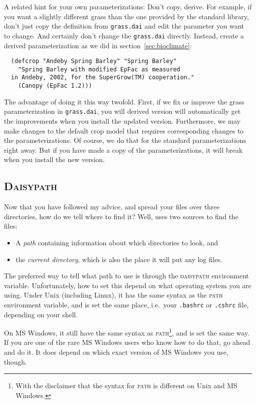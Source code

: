 \documentclass[a4paper,11pt]{article}
\begin{document}
A related hint for your own parameterizations: Don't copy, derive.
For example, if you want a slightly different grass than the one
provided by the standard \daisy{} library, don't just copy the
definition from \texttt{grass.dai} and edit the parameter you want to
change.  And certainly don't change the \texttt{grass.dai} directly.
Instead, create a derived parameterization as we did in
section~\ref{sec:bioclimate}:
\begin{verbatim}
  (defcrop "Andeby Spring Barley" "Spring Barley"
    "Spring Barley with modified EpFac as measured
  in Andeby, 2002, for the SuperGrow(TM) cooperation."
    (Canopy (EpFac 1.2)))
\end{verbatim}
The advantage of doing it this way twofold.  First, if we fix or
improve the grass parameterization in \texttt{grass.dai}, you will
derived version will automatically get the improvements when you
install the updated \daisy{} version.  Furthermore, we may make
changes to the default crop model that requires corresponding changes
to the parameterizations.  Of course, we do that for the standard
parameterizations right away.  But if you have made a copy of the
parameterizations, it will break when you install the new version.

\subsection{\textsc{Daisypath}}
\label{sec:daisypath}

Now that you have followed my advice, and spread your files over three
directories, how do we tell \daisy{} where to find it?  Well, \daisy{}
uses two sources to find the files:
\begin{itemize}
\item A \emph{path} containing information about which directories to
  look, and
\item the \emph{current directory}, which is also the place it will
  put any log files. 
\end{itemize}

The preferred way to tell \daisy{} what path to use is through the
\textsc{daisypath} environment variable.  Unfortunately, how to set
this depend on what operating system you are using.  Under Unix
(including Linux), it has the same syntax as the \textsc{path}
environment variable, and is set the same place, i.e.\ your
\texttt{.bashrc} or \texttt{.cshrc} file, depending on your shell. 

On MS Windows, it still have the same syntax as
\textsc{path}\footnote{With the disclaimer that the syntax for
  \textsc{path} is different on Unix and MS Windows.}, and is set the
same way.  If you are one of the rare MS Windows users who know how to
do that, go ahead and do it.  It does depend on which exact version of
MS Windows you use, though.  
\end{document}
